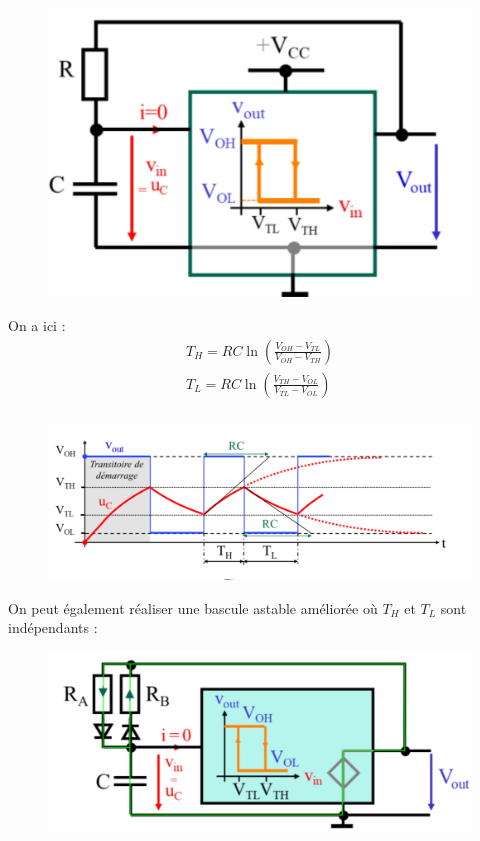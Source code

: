 \documentclass[../main.tex]{subfiles}
\begin{document}
\begin{figure}[hbt!]
    \centering
    \includegraphics[width=.6\textwidth]{IMAGES/elec/IMG_0149.jpeg}
\end{figure}

On a ici : \begin{equation}
    \begin{gathered}
        T_H = RC\ln(\frac{V_{OH}-V_{TL}}{V_{OH}-V_{TH}})\\
        T_L = RC\ln(\frac{V_{TH}-V_{OL}}{V_{TL}-V_{OL}})\\
    \end{gathered}
\end{equation}

\begin{figure}[hbt!]
    \centering
    \includegraphics[width=.7\textwidth]{IMAGES/elec/IMG_0150.jpeg}
\end{figure}

On peut également réaliser une bascule astable améliorée où $T_H$ et $T_L$ sont indépendants : \\

\begin{figure}[hbt!]
    \centering
    \includegraphics[width=.6\textwidth]{IMAGES/elec/IMG_0151.jpeg}
\end{figure}
\end{document}
